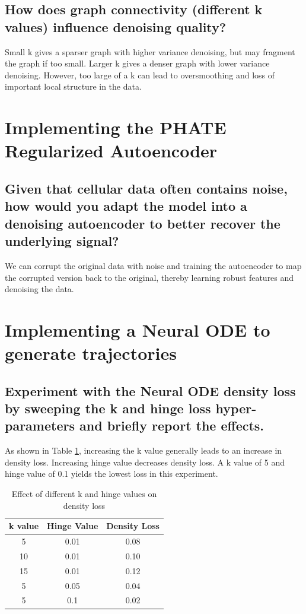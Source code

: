 \documentclass[11pt]{article}
\begin{document}
\subsection{How does graph connectivity (different k values) influence denoising quality?}
Small k gives a sparser graph with higher variance denoising, but may fragment the graph if too small.
Larger k gives a denser graph with lower variance denoising. However, too large of a k can lead to oversmoothing and loss of important local structure in the data.

\section{Implementing the PHATE Regularized Autoencoder}
\subsection{Given that cellular data often contains noise, how would you adapt the model into a denoising
autoencoder to better recover the underlying signal?}
We can corrupt the original data with noise and training the autoencoder to map the corrupted version back 
to the original, thereby learning robust features and denoising the data.


\section{Implementing a Neural ODE to generate trajectories}
\subsection{Experiment with the Neural ODE density loss by sweeping the k and hinge loss hyper-parameters and briefly report the effects.}
As shown in Table \ref{tab:density_loss}, increasing the k value generally leads to an increase
in density loss. Increasing hinge value decreases density loss. A k value of 5 and 
hinge value of 0.1 yields the lowest loss in this experiment.

    \begin{table}[h!]
    \centering
    \begin{tabular}{|c|c|c|}
    \hline
    k value & Hinge Value & Density Loss \\
    \hline
    5 & 0.01 & 0.08 \\
    10 & 0.01 & 0.10 \\
    15 & 0.01 & 0.12 \\
    5 & 0.05 & 0.04 \\
    5 & 0.1 & 0.02 \\
    \hline
    \end{tabular}
    \caption{Effect of different k and hinge values on density loss}
    \label{tab:density_loss}
    \end{table}
\end{document}
